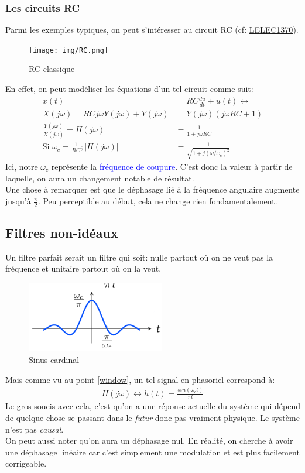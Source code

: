 \documentclass{report}
\begin{document}
\newpage %

\subsubsection{Les circuits RC}
Parmi les exemples typiques, on peut s'intéresser au circuit RC (cf: \href{https://github.com/Tfloow/Q4_EPL/blob/main/SyntheseCompilee/LELEC1370.pdf}{LELEC1370}). 
\begin{figure}
\centering
\texttt{[image: img/RC.png]}
\caption{RC classique}
\end{figure}
En effet, on peut modéliser les équations d'un tel circuit comme suit:
\begin{align*}
x(t) &= R C \frac{du}{dt} + u(t) \longleftrightarrow\\
X(j \omega) = RC j \omega Y(j \omega) + Y(j \omega) &= Y(j \omega) (j\omega RC+1)\\
\frac{Y(j \omega)}{X(j \omega)} = H(j \omega) &= \frac{1}{1+ j \omega RC}\\
\text{Si } \omega_c = \frac{1}{RC}; |H(j\omega)| &= \frac{1}{\sqrt{1 + j(\omega / \omega_c)^2}}
\end{align*}
Ici, notre $\omega_c$ représente la \textcolor{blue}{fréquence de coupure}. C'est donc la valeur à partir de laquelle, on aura un changement notable de résultat.\\
Une chose à remarquer est que le déphasage lié à la fréquence angulaire augmente jusqu'à $\frac{\pi}{2}$. Peu perceptible au début, cela ne change rien fondamentalement.

\subsection{Filtres non-idéaux}
Un filtre parfait serait un filtre qui soit: nulle partout où on ne veut pas la fréquence et unitaire partout où on la veut.\\
\begin{figure}
\centering
\includegraphics[width=6cm]{img/sinc.png}
\caption{Sinus cardinal}
\end{figure}
Mais comme vu au point \ref{window}, un tel signal en phasoriel correspond à:
\begin{align*}
H(j\omega) \longleftrightarrow h(t) = \frac{sin(\omega_c t)}{\pi t}
\end{align*}
Le gros soucis avec cela, c'est qu'on a une réponse actuelle du système qui dépend de quelque chose se passant dans le \textit{futur} donc pas vraiment physique. Le système n'est pas \textit{causal}.\\
On peut aussi noter qu'on aura un déphasage nul. En réalité, on cherche à avoir une déphasage linéaire car c'est simplement une modulation et est plus facilement corrigeable.
\end{document}
